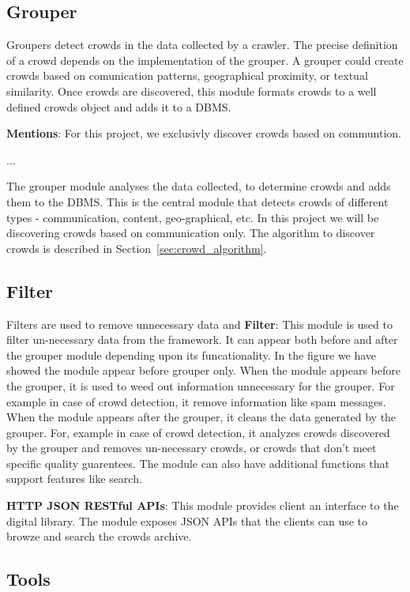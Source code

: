 \documentclass{sig-alternate}
\begin{document}
\subsection{Grouper}
Groupers detect crowds in the data collected by a crawler.  The precise
definition of a crowd depends on the implementation of the grouper.  A grouper
could create crowds based on comunication patterns, geographical proximity, or
textual similarity. Once crowds are discovered, this module formats crowds to a
well defined crowds object and adds it to a DBMS.

\medskip \noindent \textbf{Mentions}:
For this project, we exclusivly discover crowds based on communtion.

...

The grouper module analyses the data
collected, to determine crowds and adds them to the DBMS. This is the central
module that detects crowds of different types - communication, content,
geo-graphical, etc. In this project we will be discovering crowds based on
communication only. The algorithm to discover crowds is described in
Section~\ref{sec:crowd_algorithm}.

\subsection{Filter}
Filters are used to remove unnecessary data and 
\medskip \noindent \textbf{Filter}: This module is used to filter un-necessary
data from the framework. It can appear both before and after the grouper module
depending upon its funcationality. In the figure we have showed the module
appear before grouper only. When the module appears before the grouper, it is
used to weed out information unnecessary for the grouper. For example in case
of crowd detection, it remove information like spam messages. When the module
appears after the grouper, it cleans the data generated by the grouper. For,
example in case of crowd detection, it analyzes crowds discovered by the
grouper and removes un-necessary crowds, or crowds that don't meet specific
quality guarentees. The module can also have additional functions that support
features like search.

\medskip \noindent \textbf{HTTP JSON RESTful APIs}: This module provides client an interface to the digital library. The module exposes JSON APIs that the clients can use to browze and search the crowds archive.

\subsection{Tools}
\end{document}
